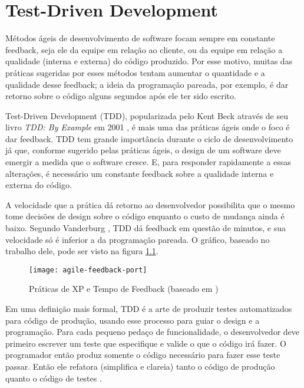\chapter{Test-Driven Development}
\label{cap:tdd}

Métodos ágeis de desenvolvimento de software focam sempre em constante
feedback, seja ele da equipe em relação ao cliente, ou da equipe em relação a
qualidade (interna e externa) do código produzido. Por esse motivo, muitas das
práticas sugeridas por esses métodos tentam aumentar o quantidade e a qualidade
desse feedback; a ideia da programação pareada, por exemplo, é dar retorno
sobre o código alguns segundos após ele ter sido escrito.

Test-Driven Development (TDD), popularizada pelo Kent Beck através de seu livro
\textit{TDD: By Example} em 2001 \cite{TDDByExample}, é mais uma das práticas
ágeis onde o foco é dar feedback. TDD tem grande importância durante o ciclo de
desenvolvimento já que, conforme sugerido pelas práticas ágeis, o design de um
software deve emergir a medida que o software cresce. E, para responder
rapidamente a essas alterações, é necessário um constante feedback sobre a
qualidade interna e externa do código.

A velocidade que a prática dá retorno ao desenvolvedor possibilita que o mesmo
tome decisões de design sobre o código enquanto o custo de mudança ainda é
baixo. Segundo Vanderburg \cite{vanderburg}, TDD dá feedback em questão de
minutos, e sua velocidade só é inferior a da programação pareada. O gráfico,
baseado no trabalho dele, pode ser visto na figura
\ref{fig:agile-feedback}.

\begin{figure}
  \centering
  \texttt{[image: agile-feedback-port]}
  \caption{Práticas de XP e Tempo de Feedback (baseado em \cite{vanderburg})}
  \label{fig:agile-feedback}
\end{figure}

Em uma definição mais formal, TDD é a arte de produzir testes automatizados para
código de produção, usando esse processo para guiar o design e a programação.
Para cada pequeno pedaço de funcionalidade, o desenvolvedor deve primeiro
escrever um teste que especifique e valide o que o código irá fazer. O
programador então produz somente o código necessário para fazer esse teste
passar. Então ele refatora (simplifica e clareia) tanto o código de produção
quanto o código de testes \cite{agilealliance-tdd} \cite{tdd-taxonomy}.

